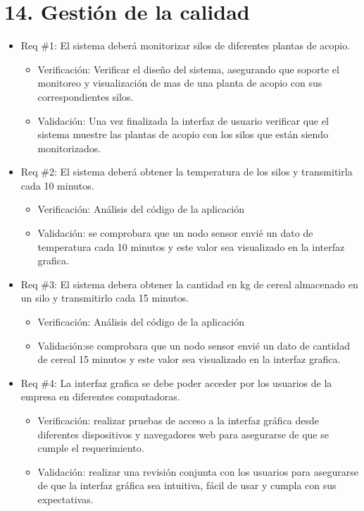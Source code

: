 \documentclass[
11pt, %
]{charter}
\begin{document}
\section{14. Gestión de la calidad}
\label{sec:calidad}

\begin{itemize} 
\item Req \#1: El sistema deberá monitorizar silos de diferentes plantas de acopio.
\begin{itemize}
	\item Verificación: Verificar el diseño del sistema, asegurando que soporte el monitoreo y visualización de mas de una planta de acopio con sus correspondientes silos. 
	\item Validación: Una vez finalizada la interfaz de usuario verificar que el sistema muestre las plantas de acopio con los silos que están siendo monitorizados. 
\end{itemize}

\item Req \#2: El sistema deberá obtener la temperatura de los silos y transmitirla cada 10 minutos.
\begin{itemize}
	\item Verificación: Análisis del código de la aplicación
	\item Validación: se comprobara que un nodo sensor envié un dato de temperatura cada 10 minutos y este valor sea visualizado en la interfaz grafica. 
\end{itemize}

\item Req \#3: El sistema debera obtener la cantidad en kg de cereal almacenado en un silo y
transmitirlo cada 15 minutos.
\begin{itemize}
	\item Verificación: Análisis del código de la aplicación
	\item Validación:se comprobara que un nodo sensor envié un dato de cantidad de cereal 15 minutos y este valor sea visualizado en la interfaz grafica. 
\end{itemize}

\item Req \#4: La interfaz grafica se debe poder acceder por los usuarios de la empresa en diferentes
computadoras.
\begin{itemize}
	\item Verificación: realizar pruebas de acceso a la interfaz gráfica desde diferentes dispositivos y navegadores web para asegurarse de que se cumple el requerimiento.
	\item Validación: realizar una revisión conjunta con los usuarios para asegurarse de que la interfaz gráfica sea intuitiva, fácil de usar y cumpla con sus expectativas.
\end{itemize}


\end{itemize}
\end{document}
